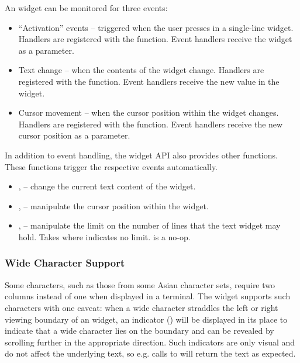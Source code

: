 An  widget can be monitored for three events:

\begin{itemize}
\item ``Activation'' events -- triggered when the user presses
   in a single-line  widget.  Handlers are
  registered with the  function.  Event handlers
  receive the  widget as a parameter.
\item Text change -- when the contents of the  widget change.
  Handlers are registered with the  function.  Event
  handlers receive the new  value in the  widget.
\item Cursor movement -- when the cursor position within the 
  widget changes.  Handlers are registered with the 
  function.  Event handlers receive the new cursor position as a
  parameter.
\end{itemize}

In addition to event handling, the  widget API also provides
other functions.  These functions trigger the respective events
automatically.

\begin{itemize}
\item {},  -- change the current text
  content of the  widget.
\item {},  --
  manipulate the cursor position within the  widget.
\item {},  -- manipulate the
  limit on the number of lines that the text widget may hold.  Takes
   where  indicates no limit.
   is a no-op.
\end{itemize}

\subsubsection{Wide Character Support}

Some characters, such as those from some Asian character sets, require
two columns instead of one when displayed in a terminal.  The
 widget supports such characters with one caveat: when a wide
character straddles the left or right viewing boundary of an 
widget, an indicator (\fw{\$}) will be displayed in its place to
indicate that a wide character lies on the boundary and can be
revealed by scrolling further in the appropriate direction.  Such
indicators are only visual and do not affect the underlying text, so
e.g. calls to  will return the text as expected.

